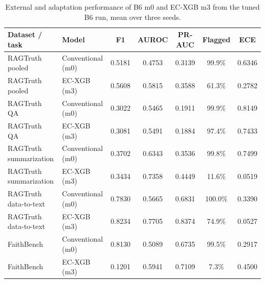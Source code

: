 \documentclass[a4paper,fleqn]{cas-sc}
\begin{document}
\begin{table}[pos=htbp]
  \centering
  \caption{External and adaptation performance of B6 m0 and EC-XGB m3 from the tuned B6 run, mean over three seeds.}
  \label{tab:shift}
  \begin{tabular}{llccccc}
    \toprule
    \textbf{Dataset / task} & \textbf{Model}    & \textbf{F1} & \textbf{AUROC} & \textbf{PR-AUC} & \textbf{Flagged} & \textbf{ECE} \\
    \midrule
    RAGTruth pooled         & Conventional (m0) & 0.5181      & 0.4753         & 0.3139          & 99.9\%           & 0.6346       \\
    RAGTruth pooled         & EC-XGB (m3)       & 0.5608      & 0.5815         & 0.3588          & 61.3\%           & 0.2782       \\
    \addlinespace
    RAGTruth QA             & Conventional (m0) & 0.3022      & 0.5465         & 0.1911          & 99.9\%           & 0.8149       \\
    RAGTruth QA             & EC-XGB (m3)       & 0.3081      & 0.5491         & 0.1884          & 97.4\%           & 0.7433       \\
    \addlinespace
    RAGTruth summarization  & Conventional (m0) & 0.3702      & 0.6343         & 0.3536          & 99.8\%           & 0.7499       \\
    RAGTruth summarization  & EC-XGB (m3)       & 0.3434      & 0.7358         & 0.4449          & 11.6\%           & 0.0519       \\
    \addlinespace
    RAGTruth data-to-text   & Conventional (m0) & 0.7830      & 0.5665         & 0.6831          & 100.0\%          & 0.3390       \\
    RAGTruth data-to-text   & EC-XGB (m3)       & 0.8234      & 0.7705         & 0.8374          & 74.9\%           & 0.0527       \\
    \addlinespace
    FaithBench              & Conventional (m0) & 0.8130      & 0.5089         & 0.6735          & 99.5\%           & 0.2917       \\
    FaithBench              & EC-XGB (m3)       & 0.1201      & 0.5941         & 0.7109          & 7.3\%            & 0.4500       \\
    \bottomrule
  \end{tabular}
\end{table}
\end{document}
